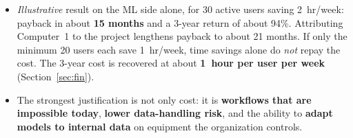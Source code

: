 \begin{itemize}
  \item \emph{Illustrative} result on the ML side alone, for 30 active users saving
    2~hr/week: payback in about \textbf{15 months} and a 3-year return of about 94\%.
    Attributing Computer~1 to the project lengthens payback to about 21 months. If only
    the minimum 20 users each save 1~hr/week, time savings alone do \emph{not} repay the
    cost. The 3-year cost is recovered at about \textbf{1~hour per user per week}
    (Section~\ref{sec:fin}).
  \item The strongest justification is not only cost: it is \textbf{workflows that
    are impossible today}, \textbf{lower data-handling risk}, and the ability to
    \textbf{adapt models to internal data} on equipment the organization controls.
\end{itemize}
